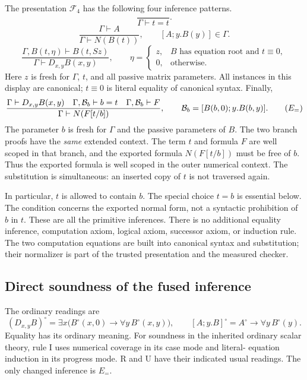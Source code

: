 The presentation $\mathcal F_4$ has the following four inference patterns.
\[
 \frac{}{\Gamma\vdash t=t}.\tag{R}\label{fus:refl}
\]
\[
 \frac{\Gamma\vdash A}{\Gamma\vdash N(B(t))},
 \qquad [A;y.B(y)]\in\Gamma.\tag{U}\label{fus:use}
\]
\[
 \frac{\Gamma,B(t,\eta)\vdash B(t,Sz)}
      {\Gamma\vdash D_{x,y}B(x,y)},\qquad
 \eta=\begin{cases}
 z,& B\text{ has equation root and }t\equiv0,\\
 0,&\text{otherwise}.
 \end{cases}\tag{I}\label{fus:intro}
\]
Here $z$ is fresh for $\Gamma$, $t$, and all passive matrix parameters. All
instances in this display are canonical; $t\equiv0$ is literal equality of
canonical syntax. Finally,
\[
\frac{
 \Gamma\vdash D_{x,y}B(x,y)
 \quad
 \Gamma,\mathcal B_b\vdash b=t
 \quad
 \Gamma,\mathcal B_b\vdash F
}{
 \Gamma\vdash N(F[t/b])
},
\qquad
 \mathcal B_b=[B(b,0);y.B(b,y)].
\tag{$E_{=}$}\label{fus:elim}
\]
The parameter $b$ is fresh for $\Gamma$ and the passive parameters of $B$.
The two branch proofs have the \emph{same} extended context. The term $t$ and
formula $F$ are well scoped in that branch, and the exported formula
$N(F[t/b])$ must be free of $b$. Thus the exported formula is well scoped in
the outer numerical context. The substitution is simultaneous: an inserted
copy of $t$ is not traversed again.

In particular, $t$ is allowed to contain $b$. The special choice $t=b$ is
essential below. The condition concerns the exported normal form, not a
syntactic prohibition of $b$ in $t$. These are all the primitive inferences.
There is no additional equality inference, computation axiom, logical axiom,
successor axiom, or induction rule. The two computation equations are built
into canonical syntax and substitution; their normalizer is part of the
trusted presentation and the measured checker.

\subsection{Direct soundness of the fused inference}

The ordinary readings are
\[
 (D_{x,y}B)^\circ
 =\exists x\bigl(B^\circ(x,0)\to\forall y\,B^\circ(x,y)\bigr),
 \qquad
 [A;y.B]^\circ=A^\circ\to\forall y\,B^\circ(y).
\]
Equality has its ordinary meaning. For soundness in the inherited ordinary
scalar theory, rule I uses numerical coverage in its case mode and literal-
equation induction in its progress mode. R and U have their indicated usual
readings. The only changed inference is $E_{=}$.

